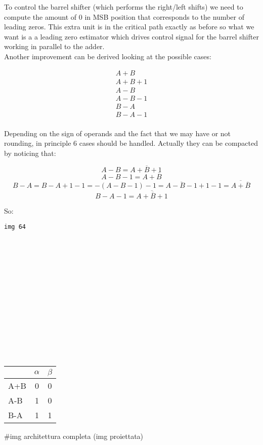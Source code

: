 To control the barrel shifter (which performs the right/left shifts) we need to
compute the amount of 0 in MSB position that corresponds to the number of
leading zeros.
This extra unit is in the critical path exactly as before so what we want is a
a leading zero estimator which drives control signal for the barrel shifter
working in parallel to the adder. \\

Another improvement can be derived looking at the possible cases:

\begin{eqnarray*}
A+B\\
A+B+1\\
A-B\\
A-B-1\\
B-A\\
B-A-1\\
\end{eqnarray*}

Depending on the sign of operands and the fact that we may have or not
rounding, in principle 6 cases should be handled. Actually they can be
compacted by noticing that:

$$A-B= A + \overline{B} +1$$
$$A-B-1 = A + \overline{B}$$
$$B-A= B - A +1-1= -(A-B-1)-1= \overline{A-B-1} +1-1= \overline{A+ \overline{B}}$$
$$B-A-1= \overline{A+ \overline{B}+1}$$


So:

\begin{verbatim}
img 64
















\end{verbatim}

\begin{center}
  \begin{tabular}{|l|c|c|}
    \hline
     &    $\alpha$&   $\beta$ \\
    \hline
    A+B&    0&      0\\
    A-B&    1&      0\\
    B-A&    1&      1\\
    \hline
  \end{tabular}
\end{center}

\#img architettura completa (img proiettata)

